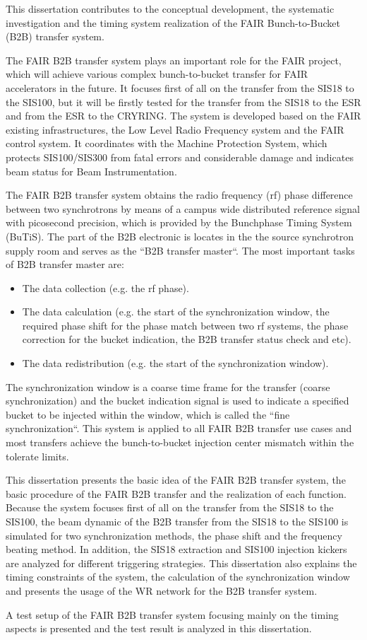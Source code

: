 This dissertation contributes to the conceptual development, the systematic investigation and the timing system realization of the FAIR Bunch-to-Bucket (B2B) transfer system. 

The FAIR B2B transfer system plays an important role for the FAIR project, which will achieve various complex bunch-to-bucket transfer for FAIR accelerators in the future. It focuses first of all on the transfer from the SIS18 to the SIS100, but it will be firstly tested for the transfer from the SIS18 to the ESR and from the ESR to the CRYRING. The system is developed based on the FAIR existing infrastructures, the Low Level Radio Frequency system and the FAIR control system. It coordinates with the Machine Protection System, which protects SIS100/SIS300 from fatal errors and considerable damage and indicates beam status for Beam Instrumentation. 
 
The FAIR B2B transfer system obtains the radio frequency (rf) phase difference between two synchrotrons by means of a campus wide distributed reference signal with picosecond precision, which is provided by the Bunchphase Timing System (BuTiS). The part of the B2B electronic is locates in the the source synchrotron supply room and serves as the ``B2B transfer master``. The most important tasks of B2B transfer master are:
\begin{itemize}

	\item 	The data collection (e.g. the rf phase). 

   \item 	The data calculation (e.g. the start of the synchronization window, the required phase shift for the phase match between two rf systems, the phase correction for the bucket indication, the B2B transfer status check and etc). 

   \item 	The data redistribution (e.g. the start of the synchronization window).
\end{itemize}
The synchronization window is a coarse time frame for the transfer (coarse synchronization) and the bucket indication signal is used to indicate a specified bucket to be injected within the window, which is called the ``fine synchronization``. This system is applied to all FAIR B2B transfer use cases and most transfers achieve the bunch-to-bucket injection center mismatch within the tolerate limits.

This dissertation presents the basic idea of the FAIR B2B transfer system, the basic procedure of the FAIR B2B transfer and the realization of each function.
%
Because the system focuses first of all on the transfer from the SIS18 to the SIS100, the beam dynamic of the B2B transfer from the SIS18 to the SIS100 is simulated for two synchronization methods, the phase shift and the frequency beating method. In addition, the SIS18 extraction and SIS100 injection kickers are analyzed for different triggering strategies. This dissertation also explains the timing constraints of the system, the calculation of the synchronization window and presents the usage of the WR network for the B2B transfer system. 

A test setup of the FAIR B2B transfer system focusing mainly on the timing aspects is presented and the test result is analyzed in this dissertation. 
